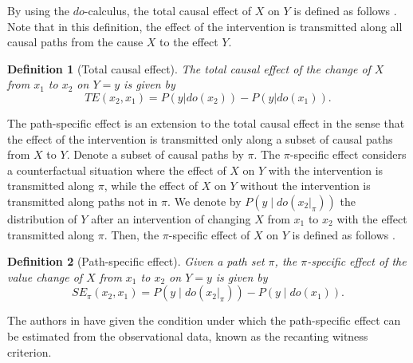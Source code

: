 \documentclass[letterpaper]{article}
\newtheorem{definition}{Definition}
\begin{document}
By using the $do$-calculus, the total causal effect of $X$ on $Y$ is defined as follows \cite{pearl2009causality}. Note that in this definition, the effect of the intervention is transmitted along all causal paths from the cause $X$ to the effect $Y$.
\begin{definition}[Total causal effect]
The total causal effect of the change of $X$ from $x_{1}$ to $x_{2}$ on $Y=y$ is given by
\begin{equation*}
TE(x_{2},x_{1}) = P(y|do(x_{2}))-P(y|do(x_{1})).
\end{equation*}
\end{definition}

The path-specific effect is an extension to the total causal effect in the sense that the effect of the intervention is transmitted only along a subset of causal paths from $X$ to $Y$. Denote a subset of causal paths by $\pi$. The $\pi$-specific effect considers a counterfactual situation where the effect of $X$ on $Y$ with the intervention is transmitted along $\pi$, while the effect of $X$ on $Y$ without the intervention is transmitted along paths not in $\pi$. We denote by $P(y\mid do(x_{2}|_{\pi}))$ the distribution of $Y$ after an intervention of changing $X$ from $x_{1}$ to $x_{2}$ with the effect transmitted along $\pi$. Then, the $\pi$-specific effect of $X$ on $Y$ is defined as follows \cite{avin2005identifiability}.
\begin{definition}[Path-specific effect]
Given a path set $\pi$, the $\pi$-specific effect of the value change of $X$ from $x_{1}$ to $x_{2}$ on $Y=y$ is given by
\begin{equation*}
SE_{\pi}(x_{2},x_{1}) = P(y\mid do(x_{2}|_\pi)) - P(y\mid do(x_{1})).
\end{equation*}
\end{definition}


The authors in \cite{avin2005identifiability} have given the condition under which the path-specific effect can be estimated from the observational data, known as the recanting witness criterion.
\end{document}
